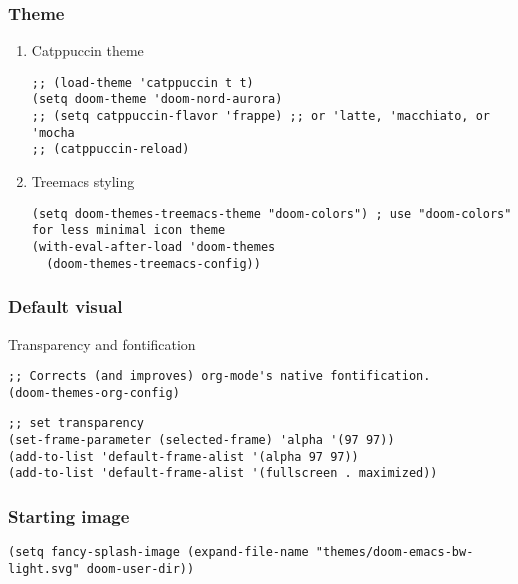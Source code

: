 \documentclass[c]{article}
\theoremstyle{plain}%
\theoremstyle{definition}
\theoremstyle{remark}
\begin{document}
\subsubsection{Theme}
\label{sec:org9e7bbf0}
\begin{enumerate}
\item Catppuccin theme
\label{sec:org7297da3}
\begin{verbatim}
;; (load-theme 'catppuccin t t)
(setq doom-theme 'doom-nord-aurora)
;; (setq catppuccin-flavor 'frappe) ;; or 'latte, 'macchiato, or 'mocha
;; (catppuccin-reload)
\end{verbatim}
\item Treemacs styling
\label{sec:org8f49ad4}
\begin{verbatim}
(setq doom-themes-treemacs-theme "doom-colors") ; use "doom-colors" for less minimal icon theme
(with-eval-after-load 'doom-themes
  (doom-themes-treemacs-config))
\end{verbatim}
\end{enumerate}
\subsubsection{Default visual}
\label{sec:orgad016d5}
Transparency and fontification
\begin{verbatim}
;; Corrects (and improves) org-mode's native fontification.
(doom-themes-org-config)
\end{verbatim}
\begin{verbatim}
;; set transparency
(set-frame-parameter (selected-frame) 'alpha '(97 97))
(add-to-list 'default-frame-alist '(alpha 97 97))
(add-to-list 'default-frame-alist '(fullscreen . maximized))
\end{verbatim}
\subsubsection{Starting image}
\label{sec:org0588a9b}
\begin{verbatim}
(setq fancy-splash-image (expand-file-name "themes/doom-emacs-bw-light.svg" doom-user-dir))
\end{verbatim}
\end{document}
